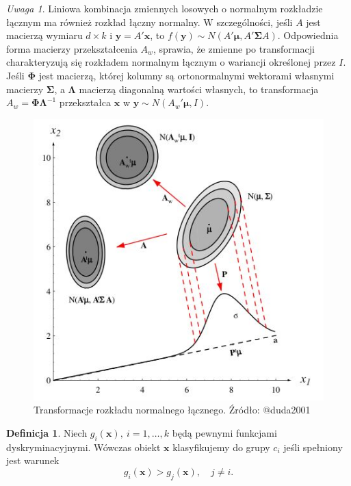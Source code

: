 \documentclass[
]{book}
\theoremstyle{plain}
\theoremstyle{definition}
\theoremstyle{definition}
\newtheorem{definition}{Definicja}[chapter]
\theoremstyle{definition}
\theoremstyle{definition}
\theoremstyle{definition}
\theoremstyle{remark}
\newtheorem*{remark}{Uwaga}
\begin{document}
\begin{remark}
Liniowa kombinacja zmiennych losowych o normalnym rozkładzie łącznym ma również rozkład łączny normalny. W szczególności, jeśli \(A\) jest macierzą wymiaru \(d\times k\) i \(\boldsymbol{y} = A'\boldsymbol{x}\), to \(f(\boldsymbol{y})\sim N(A'\boldsymbol{\mu}, A'\boldsymbol{\Sigma}A)\). Odpowiednia forma macierzy przekształcenia \(A_w\), sprawia, że zmienne po transformacji charakteryzują się rozkładem normalnym łącznym o wariancji określonej przez \(I\). Jeśli \(\boldsymbol{\Phi}\) jest macierzą, której kolumny są ortonormalnymi wektorami własnymi macierzy \(\boldsymbol{\Sigma}\), a \(\boldsymbol{\Lambda}\) macierzą diagonalną wartości własnych, to transformacja \(A_w=\boldsymbol{\Phi}\boldsymbol{\Lambda}^{-1}\) przekształca \(\boldsymbol{x}\) w \(\boldsymbol{y}\sim N(A_w'\boldsymbol{\mu}, I)\).
\end{remark}

\begin{figure}

{\centering \includegraphics[width=4.52in]{images/transform} 

}

\caption{Transformacje rozkładu normalnego łącznego. Źródło: @duda2001}\label{fig:trans}
\end{figure}

\begin{definition}
\protect\hypertarget{def:unnamed-chunk-60}{}\label{def:unnamed-chunk-60}Niech \(g_i(\boldsymbol{x}),\ i=1,\ldots,k\) będą pewnymi funkcjami dyskryminacyjnymi. Wówczas obiekt \(\boldsymbol{x}\) klasyfikujemy do grupy \(c_i\) jeśli spełniony jest warunek
\begin{equation}
    g_i(\boldsymbol{x})>g_j(\boldsymbol{x}), \quad j\neq i.
\end{equation}
\end{definition}
\end{document}
